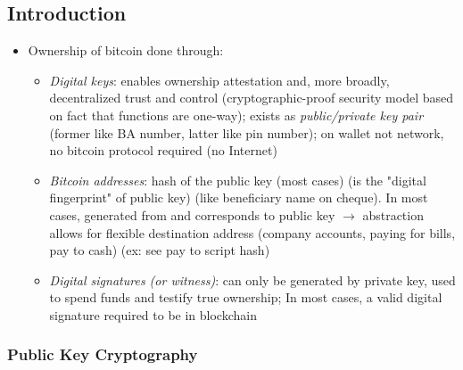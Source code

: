 \documentclass[english, 11pt]{article}
\begin{document}
\subsection{Introduction}
\begin{itemize}
    \item Ownership of bitcoin done through:
    \begin{itemize}
        \item \textit{Digital keys}: enables ownership attestation and, more broadly, decentralized trust and control (cryptographic-proof security model based on fact that functions are one-way); exists as \textit{public/private key pair} (former like BA number, latter like pin number); on wallet not network, no bitcoin protocol required (no Internet)
        \item \textit{Bitcoin addresses}: hash of the public key (most cases) (is the "digital fingerprint" of public key) (like beneficiary name on cheque). In most cases, generated from and corresponds to public key $\rightarrow$ abstraction allows for flexible destination address (company accounts, paying for bills, pay to cash) (ex: see pay to script hash)
        \item \textit{Digital signatures (or witness)}: can only be generated by private key, used to spend funds and testify true ownership; In most cases, a valid digital signature required to be in blockchain
    \end{itemize}
\end{itemize}

\subsubsection{Public Key Cryptography}
\end{document}
